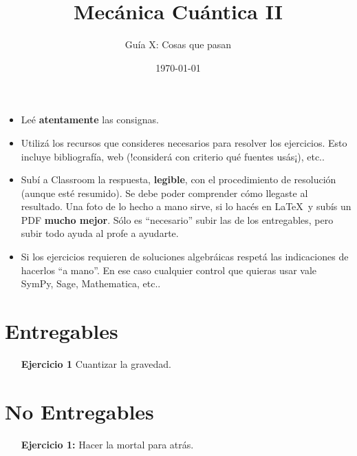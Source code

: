 \documentclass[a4paper,12pt]{article}
\begin{document}
\title{Mecánica Cuántica II}

\author{Guía X: Cosas que pasan}

\date{\today}

\maketitle

\begin{itemize}
    \item Leé {\bf atentamente} las consignas.
    \item Utilizá los recursos que consideres necesarios para resolver los ejercicios. Esto incluye bibliografía, web (!considerá con criterio qué fuentes usás¡), etc..
    \item Subí a Classroom la respuesta, {\bf legible}, con el procedimiento de resolución (aunque esté resumido). Se debe poder comprender cómo llegaste al resultado. Una foto de lo hecho a mano sirve, si lo hacés en \LaTeX\ y subís un PDF {\bf mucho mejor}. Sólo es ``necesario'' subir las de los entregables, pero subir todo ayuda al profe a ayudarte.
    \item Si los ejercicios requieren de soluciones algebráicas respetá las indicaciones de hacerlos ``a mano''. En ese caso cualquier control que quieras usar vale SymPy, Sage, Mathematica, etc.. 
\end{itemize}

\section*{Entregables}

\begin{enumerate}
    \item[\bf Ejercicio 1] Cuantizar la gravedad.  
\end{enumerate}

\section*{No Entregables}

\begin{enumerate}
    \item[\bf Ejercicio 1:] Hacer la mortal para atrás.

\end{enumerate}
\end{document}
